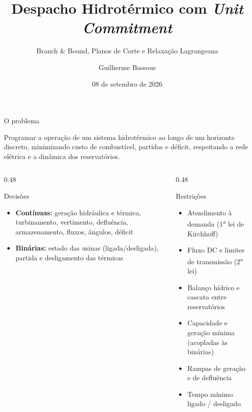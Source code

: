 \documentclass[10pt,aspectratio=169]{beamer}
\title[Despacho Hidrotérmico]{Despacho Hidrotérmico com \emph{Unit Commitment}}
\subtitle{Branch \& Bound, Planos de Corte e Relaxação Lagrangeana}
\author{Guilherme Bassous}
\institute{Otimização Combinatória I}
\date{08 de setembro de 2026}
\begin{document}
\begin{frame}[plain]
  \titlepage
\end{frame}

\begin{frame}{O problema}

  Programar a operação de um sistema hidrotérmico ao longo de um horizonte
  discreto, minimizando custo de combustível, partidas e déficit, respeitando
  a rede elétrica e a dinâmica dos reservatórios.

  \vspace{0.4em}
  \begin{columns}[T]
    \begin{column}{0.48\textwidth}
      \begin{block}{Decisões}
        \footnotesize
        \begin{itemize}\itemsep2pt
          \item \textbf{Contínuas:} geração hidráulica e térmica, turbinamento,
                vertimento, defluência, armazenamento, fluxos, ângulos, déficit
          \item \textbf{Binárias:} estado das usinas (ligada/desligada),
                partida e desligamento das térmicas
        \end{itemize}
      \end{block}
    \end{column}
    \begin{column}{0.48\textwidth}
      \begin{block}{Restrições}
        \footnotesize
        \begin{itemize}\itemsep2pt
          \item Atendimento à demanda (1\textsuperscript{a} lei de Kirchhoff)
          \item Fluxo DC e limites de transmissão (2\textsuperscript{a} lei)
          \item Balanço hídrico e cascata entre reservatórios
          \item Capacidade e geração mínima (acopladas às binárias)
          \item \alert{Rampas} de geração e de defluência
          \item \alert{Tempo mínimo} ligado / desligado
        \end{itemize}
      \end{block}
    \end{column}
  \end{columns}


\end{frame}
\end{document}
